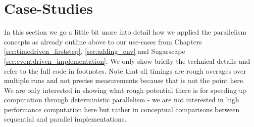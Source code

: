 \section{Case-Studies}
In this section we go a little bit more into detail how we applied the parallelism concepts as already outline above to our use-cases from Chapters \ref{sec:timedriven_firststep}, \ref{sec:adding_env} and Sugarscape \ref{sec:eventdriven_implementation}. We only show briefly the technical details and refer to the full code in footnotes. Note that all timings are rough averages over multiple runs and not precise measurements because that is not the point here. We are only interested in showing what rough potential there is for speeding up computation through deterministic parallelism - we are not interested in high performance computation here but rather in conceptual comparisons between sequential and parallel implementations.




\\
